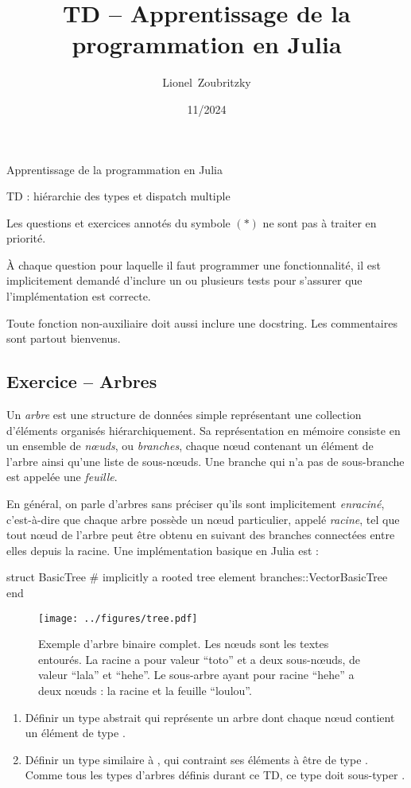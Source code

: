 \documentclass{article}
\title{TD -- Apprentissage de la programmation en Julia}
\author{Lionel~Zoubritzky}
\date{11/2024}
\newcounter{loop}
\newcounter{numEx}
\newcommand{\exo}[1]{
	\stepcounter{numEx}
	\setcounter{loop}{0}
	\subsection*{Exercice \arabic{numEx} -- #1}
}
\newenvironment{repl}{\vspace{-0.6em}\VerbatimEnvironment\begin{jlrepl}}{\end{jlrepl}}
\begin{document}
	
\begin{center}
	\Large Apprentissage de la programmation en Julia
	
	TD  : hiérarchie des types et dispatch multiple
	\vspace{2em}
\end{center}

Les questions et exercices annotés du symbole $(*)$ ne sont pas à traiter en priorité.

À chaque question pour laquelle il faut programmer une fonctionnalité, il est implicitement demandé d'inclure un ou plusieurs tests pour s'assurer que l'implémentation est correcte.

Toute fonction non-auxiliaire doit aussi inclure une docstring. Les commentaires sont partout bienvenus.

\exo{Arbres}

Un \emph{arbre} est une structure de données simple représentant une collection d'éléments organisés hiérarchiquement. Sa représentation en mémoire consiste en un ensemble de \emph{nœuds}, ou \emph{branches}, chaque nœud contenant un élément de l'arbre ainsi qu'une liste de sous-nœuds. Une branche qui n'a pas de sous-branche est appelée une \emph{feuille}.

En général, on parle d'arbres sans préciser qu'ils sont implicitement \emph{enraciné}, c'est-à-dire que chaque arbre possède un nœud particulier, appelé \emph{racine}, tel que tout nœud de l'arbre peut être obtenu en suivant des branches connectées entre elles depuis la racine. Une implémentation basique en Julia est :
\begin{repl}
	struct BasicTree  # implicitly a rooted tree
		element
		branches::Vector{BasicTree}
	end
\end{repl}

\begin{figure}[bh]
	\centering
	\texttt{[image: ../figures/tree.pdf]}
	\caption{Exemple d'arbre binaire complet. Les nœuds sont les textes entourés. La racine a pour valeur ``toto'' et a deux sous-nœuds, de valeur ``lala'' et ``hehe''. Le sous-arbre ayant pour racine ``hehe'' a deux nœuds : la racine et la feuille ``loulou''.}
\end{figure}

\begin{enumerate}
	\item Définir un type abstrait  qui représente un arbre dont chaque nœud contient un élément de type .
	
	\item Définir un type  similaire à , qui contraint ses éléments à être de type . Comme tous les types d'arbres définis durant ce TD, ce type doit sous-typer .
\end{enumerate}
\end{document}
